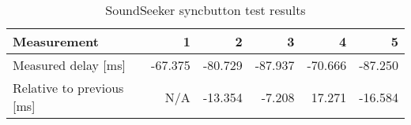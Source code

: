 \begin{table}[h]
\centering
\begin{tabular}{|l|r|r|r|r|r|}
\hline
Measurement          		& 1       & 2       & 3       & 4       & 5       \\ \hline
Measured delay [ms]       	& -67.375 & -80.729 & -87.937 & -70.666 & -87.250 \\ \hline
Relative to previous [ms] 	& N/A     & -13.354 & -7.208  & 17.271  & -16.584  \\ \hline
\end{tabular}
\caption{SoundSeeker syncbutton test results}
\label{fig:soundseekersyncbutton}
\end{table}
